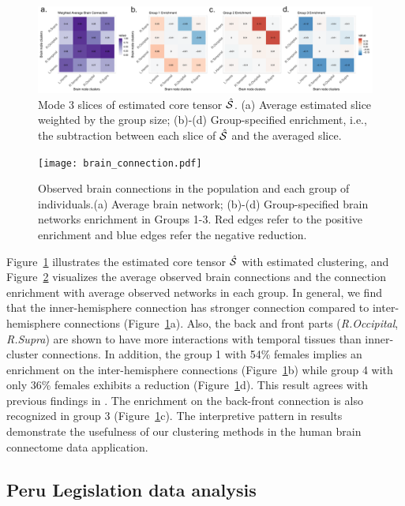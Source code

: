 \documentclass[lettersize,onecolumn,journal]{IEEEtran}
\theoremstyle{definition}
\theoremstyle{definition}
\begin{document}
\begin{figure}[htb]
    \centering
    \includegraphics[width = 1\textwidth]{est_S_anno.pdf}
    \caption{Mode 3 slices of estimated core tensor $\hat {\mathcal{S}}$. (a) Average estimated slice weighted by the group size; (b)-(d) Group-specified enrichment, i.e., the subtraction between each slice of $\hat {\mathcal{S}}$ and the averaged slice. }
    \label{fig:ests}
\end{figure}

\begin{figure}[htb]
    \centering
    \texttt{[image: brain\_connection.pdf]}
    \caption{Observed brain connections in the population and each group of individuals.(a) Average brain network; (b)-(d) Group-specified brain networks enrichment in Groups 1-3. Red edges refer to the positive enrichment and blue edges refer the negative reduction.}
    \label{fig:brain_conn}
\end{figure}

Figure~\ref{fig:ests} illustrates the estimated core tensor $\hat {\mathcal{S}}$ with estimated clustering, and Figure~\ref{fig:brain_conn} visualizes the average observed brain connections and the connection enrichment with average observed networks in each group. In general, we find that the inner-hemisphere connection has stronger connection compared to inter-hemisphere connections (Figure~\ref{fig:ests}a). Also, the back and front parts (\emph{R.Occipital}, \emph{R.Supra}) are shown to have more interactions with temporal tissues than inner-cluster connections. In addition, the group 1 with 54\% females implies an enrichment on the inter-hemisphere connections (Figure~\ref{fig:ests}b) while group 4 with only 36\% females exhibits a reduction (Figure~\ref{fig:ests}d). This result agrees with previous findings in \cite{hu2021generalized}. The enrichment on the back-front connection is also recognized in group 3 (Figure~\ref{fig:ests}c). The interpretive pattern in results demonstrate the usefulness of our clustering methods in the human brain connectome data application. 


\subsection{Peru Legislation data analysis}
\end{document}
